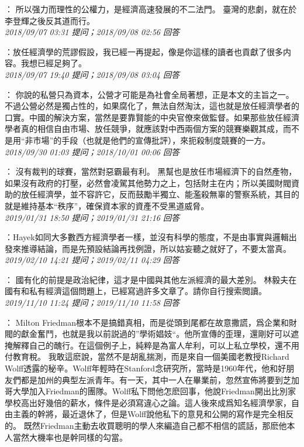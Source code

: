 \documentclass[twocolumn]{ctexart}
\begin{document}
：
所以强力而理性的公權力，是經濟高速發展的不二法門。
臺灣的悲劇，就在於李登輝之後反其道而行。
\\

\textit{\hfill\noindent\small 2018/09/07 03:31 提问；2018/09/08 02:56 回答}

：放任經濟學的荒謬假設，我已經一再提起，像是你這樣的讀者也貢獻了很多内容。我想已經足夠了。
\\

\textit{\hfill\noindent\small 2018/09/07 19:40 提问；2018/09/08 03:04 回答}

：
你說的私營只為資本，公營才可能是為社會全局著想，正是本文的主旨之一。
不過公營必然是獨占性的，如果腐化了，無法自然淘汰，這也就是放任經濟學者的口實。中國的解決方案，當然是要靠賢能的中央官僚來做監督。如果那些放任經濟學者真的相信自由市場、放任競爭，就應該對中西兩個方案的競賽樂觀其成，而不是用“非市場”的手段（也就是他們的宣傳批評），來扼殺制度競賽的一方。
\\

\textit{\hfill\noindent\small 2018/09/30 01:03 提问；2018/10/01 00:06 回答}

：
沒有裁判的球賽，當然對惡霸最有利。
黑幫也是放任市場經濟下的自然產物，如果沒有政府的打壓，必然會凌駕其他勢力之上，包括財主在内；所以美國財閥資助的放任經濟學，並不容許它，反而鼓勵半獨立、能濫殺無辜的警察系統，其目的就是維持基本“秩序”，確保資本家的資產不受黑道威脅。
\\

\textit{\hfill\noindent\small 2019/01/31 18:50 提问；2019/01/31 21:16 回答}

：Hayek如同大多數西方經濟學者一樣，並沒有科學的態度，不是由事實與邏輯出發來推導結論，而是先預設結論再找例證，所以姑妄聽之就好了，不要太當真。
\\

\textit{\hfill\noindent\small 2019/02/10 14:21 提问；2019/02/11 04:29 回答}

：
國有化的前提是政治紀律，這才是中國與其他左派經濟的最大差別。
林毅夫在國有和私有經濟這個問題上，已經寫過許多文章了。請你自行搜索閲讀。
\\

\textit{\hfill\noindent\small 2019/11/10 11:24 提问；2019/11/10 11:58 回答}

：
Milton Friedman根本不是搞錯真相，而是從頭到尾都在故意撒謊，爲企業和財閥的獻金奮鬥，也就是我以前説過的”學術娼妓“。他所宣傳的歪理，還剛好可以遮掩解釋自己的醜行。在這個例子上，純粹是為富人牟利，可以上私立學校，還不用付教育稅。 
我敢這麽說，當然不是胡亂揣測，而是來自一個美國老教授Richard Wolff透露的秘辛。Wolff年輕時在Stanford念研究所，當時是1960年代，他和好朋友們都是加州的典型左派青年。有一天，其中一人在畢業前，忽然宣佈將要到芝加哥大學加入Friedman的團隊。Wolff私下問他怎麽回事，他說Friedman開出比別家學校高出好幾倍的薪水，條件是必須寫違心之論。這人後來成爲知名經濟學家，自由主義的幹將，最近退休了，但是Wolff說他私下的意見和公開的寫作是完全相反的。 
既然Friedman主動去收買聰明的學人來編造自己都不相信的謊話，那麽他本人當然大機率也是幹同樣的勾當。
\\
\end{document}
